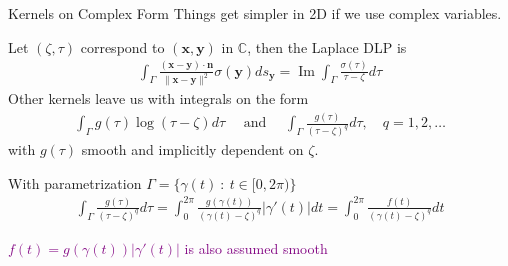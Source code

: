 \documentclass[t]{beamer}
\newcommand{\mbf}[1]{{\bm #1}}           %
\newcommand{\com}[1]{{\scriptsize \textcolor{purple}{#1}}}      %
\newcommand{\vg}{\vspace{2ex}}
\DeclareMathOperator{\im}{Im}
\newcommand{\xx}{\mbf{x}}
\newcommand{\yy}{\mbf{y}}
\newcommand{\nn}{\mbf{n}}
\begin{document}
\begin{frame}{Kernels on Complex Form}
  Things get simpler in 2D if we use complex variables.

  Let $(\zeta, \tau)$ correspond to $(\xx, \yy)$ in $\mathbb C$, then the Laplace DLP is
  \begin{align}
    \int_\Gamma \frac{(\xx-\yy)\cdot\nn}{\|\xx-\yy\|^2} \sigma(\yy) ds_\yy
    =
    \im \int_\Gamma \frac{\sigma(\tau)}{\tau-\zeta} d\tau
  \end{align}
  \pause
  Other kernels leave us with integrals on the form
  \begin{align}
    \int_\Gamma g(\tau)\log(\tau-\zeta)d\tau \quad \text{ and } \quad
    \int_\Gamma \frac{g(\tau)}{(\tau-\zeta)^q} d\tau, \quad q=1,2,\dots
  \end{align}
  with $g(\tau)$ smooth and implicitly dependent on $\zeta$.

  \pause
  \vg
  With parametrization $\Gamma = \{\gamma(t)\::\:t\in[0, 2\pi)  \}$
  \begin{align}
    \int_\Gamma \frac{g(\tau)}{(\tau-\zeta)^q} d\tau
    =
    \int_0^{2\pi} \frac{g(\gamma(t))}{(\gamma(t)-\zeta)^q} |\gamma'(t)| dt
    =
    \int_0^{2\pi} \frac{f(t)}{(\gamma(t)-\zeta)^q}dt
  \end{align}

  \com{$f(t)=g(\gamma(t))|\gamma'(t)|$ is also assumed smooth}
\end{frame}
\end{document}
